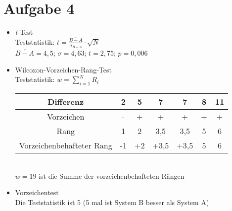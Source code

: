 \section*{Aufgabe 4}
\begin{itemize}
\item \textit{t}-Test\\
Teststatistik: $t = \frac{\overline{B - A}}{\sigma_{B-A}} \cdot \sqrt{N}$\\
$\overline{B-A} = 4,5 $; $\sigma = 4,63$; $t= 2,75$; $p = 0,006$
\item Wilcoxon-Vorzeichen-Rang-Test\\
Teststatistik: $w = \sum_{i=1}^N R_i$\\
\begin{tabular}{|c|c|c|c|c|c|c|}
\hline 
Differenz & 2 & 5 & 7 & 7 & 8 & 11 \\ 
\hline 
Vorzeichen & - & + & + & + & + & + \\ 
\hline 
Rang & 1 & 2 & 3,5 & 3,5 & 5 & 6 \\ 
\hline 
Vorzeichenbehafteter Rang & -1 & +2 & +3,5 & +3,5 & 5 & 6 \\ 
\hline 
\end{tabular}\\ 
$w = 19$ ist die Summe der vorzeichenbehafteten Rängen
\item Vorzeichentest\\
Die Teststatistik ist 5 (5 mal ist System B besser als System A)\\
\end{itemize}